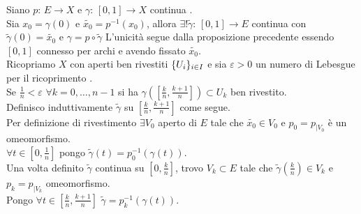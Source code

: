 \begin{prop}\bianco
Siano $p:\, E \to X$ e $\gamma :\, [0,1] \to X$ continua .\\
Sia $x_0 =\gamma(0)$ e $\tilde{x_0} = p^{-1}(x_0)$, allora $\exists ! \tilde{\gamma}:\, [0,1]\to E $ continua con $\tilde{\gamma}(0)=\tilde{x_0}$ e $\gamma=p \circ \tilde{\gamma}$
\proof L'unicit\`a segue dalla proposizione precedente essendo $[0,1]$ connesso per archi e avendo fissato $\tilde{x_0}$.\\
Ricopriamo $X$ con aperti ben rivestiti $\displaystyle \{ U_i\}_{i \in I}$ e sia $\varepsilon>0$ un numero di Lebesgue per il ricoprimento .\\
Se $\frac{1}{n}< \varepsilon$ $\forall k =0, \dots, n-1$ si ha $\gamma \left( \left[ \frac{k}{n},\frac{k+1}{n} \right] \right)\subset U_k$ ben rivestito.\\
Definisco induttivamente $\tilde{\gamma}$ su $\left[ \frac{k}{n},\frac{k+1}{n} \right]$ come segue.\\
Per definizione di rivestimento $\exists V_0$ aperto di $E$ tale che $\tilde{x_0}\in V_0$ e $p_0=p_{\vert V_0}$ \`e un omeomorfismo.\\
$\forall t\in \left[ 0, \frac{1}{n} \right]$ pongo $\tilde{\gamma}(t)= p_0^{-1} (\gamma(t))$.\\
Una volta definito $\tilde{\gamma}$ continua su $ \left[ 0 ,\frac{k}{n}\right]$, trovo $V_k \subset E$ tale che $\tilde{\gamma}\left( \frac{k}{n} \right) \in V_k$ e $p_k= p_{\vert V_k}$ omeomorfismo.\\
Pongo $\forall  t \in \left[ \frac{k}{n},\frac{k+1}{n} \right]$ $\tilde{\gamma}=p_k^{-1}(\gamma(t))$.\\
\endproof
\end{prop}
